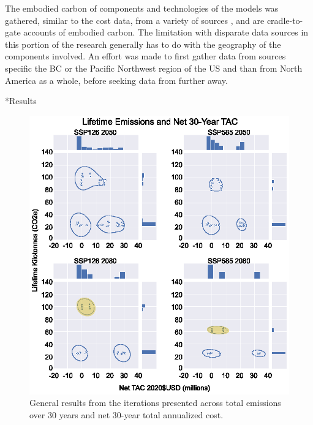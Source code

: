\documentclass[twocolumn, a4paper,10pt]{article}
\makeatletter
\renewcommand\section{\@startsection{section}{1}{\z@}{3pt}{3pt}{\normalfont\large\bfseries}}
\makeatother
\begin{document}
The embodied carbon of components and technologies of the models was gathered, similar to the cost data, from a variety of sources \citep{jones_ice_2019, droguett_embodied_2019,c-change_labs_embodied_2020}, and are cradle-to-gate accounts of embodied carbon. The limitation with disparate data sources in this portion of the research generally has to do with the geography of the components involved. An effort was made to first gather data from sources specific the BC or the Pacific Northwest region of the US and than from North America as a whole, before seeking data from further away. 

\section*{Results}
\begin{figure}[hbpt]
    \centering
    \captionsetup{margin=.5cm}
    \includegraphics[scale=0.8]{figures/general_results_box.eps}
    \caption{General results from the iterations presented across total emissions over 30 years and net 30-year total annualized cost.}
    \label{fig:cross_plot}
\end{figure}
\end{document}

